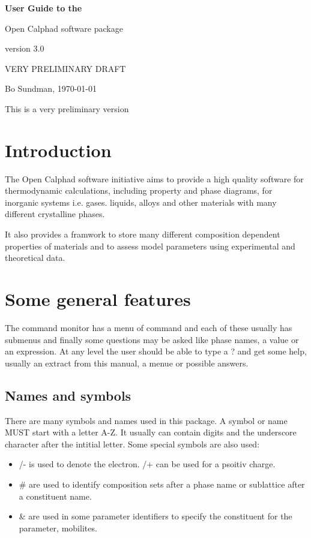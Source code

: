 \documentclass[12pt]{article}
\begin{document}
\begin{center}

{\Huge \bf User Guide to the 

Open Calphad software package

version 3.0

}

\bigskip

VERY PRELIMINARY DRAFT

Bo Sundman, \today

\end{center}

This is a very preliminary version

\section{Introduction}

The Open Calphad software initiative aims to provide a high quality
software for thermodynamic calculations, including property and phase
diagrams, for inorganic systems i.e.  gases. liquids, alloys and other
materials with many different crystalline phases.

It also provides a framwork to store many different composition
dependent properties of materials and to assess model parameters using
experimental and theoretical data.

\section{Some general features}

The command monitor has a menu of command and each of these usually
has submenus and finally some questions may be asked like phase names,
a value or an expression.  At any level the user should be able to
type a ? and get some help, usually an extract from this manual, a
menue or possible answers.

\subsection{Names and symbols}

There are many symbols and names used in this package.  A symbol or
name MUST start with a letter A-Z.  It usually can contain digits and
the underscore character after the intitial letter.  Some special
symbols are also used:

\begin{itemize}
\item /- is used to denote the electron. /+ can be used for a psoitiv charge.
\item \# are used to identify composition sets after a phase name or
sublattice after a constituent name.
\item \& are used in some parameter identifiers to specify the
  constituent for the parameter, mobilites.
\end{itemize}
\end{document}
